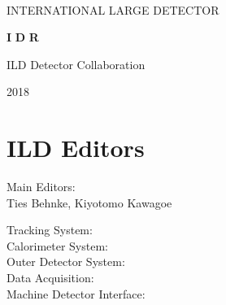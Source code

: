 %
%
\begin{titlepage}
\begin{center}
~
 ~\vskip 4cm

    {\huge  INTERNATIONAL} 
    {\huge  LARGE} 
    {\huge  DETECTOR}
    
  \vskip 1.2cm

    {\huge \bfseries I}
    {\huge \bfseries D}
    {\huge \bfseries R}

  \vskip 1.2cm




{\huge ILD Detector Collaboration} \\
    
  \vskip 0.5cm

{\huge }

  \vskip 3cm

    {\huge 2018}

\end{center}
\end{titlepage}

\newpage\thispagestyle{empty}
\cleardoublepage


\chapter*{ILD Editors}
\noindent Main Editors:\\
Ties Behnke, Kiyotomo Kawagoe

\vspace*{2mm}


\noindent Tracking System:\\


\vspace*{2mm}
\noindent Calorimeter System:\\


\vspace*{2mm}
\noindent Outer Detector System:\\

\vspace*{2mm}
\noindent Data Acquisition: \\

\vspace*{2mm}
\noindent Machine Detector Interface:\\

